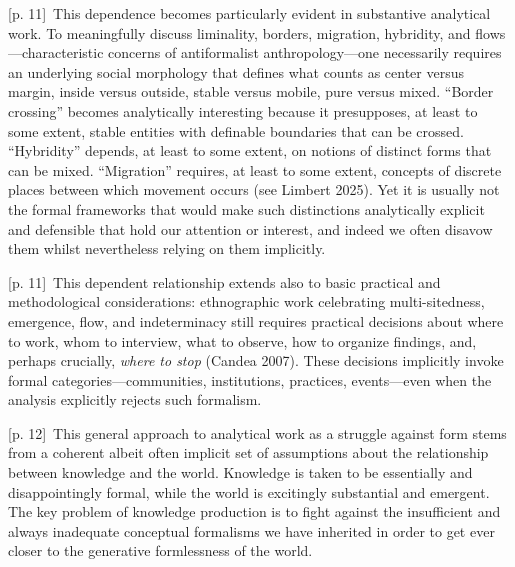 \documentclass[10pt,a4paper]{article}
\begin{document}
{\scriptsize\color{gray} [p. 11]}\ This dependence becomes particularly evident in substantive analytical work. To meaningfully discuss liminality, borders, migration, hybridity, and flows—characteristic concerns of antiformalist anthropology—one necessarily requires an underlying social morphology that defines what counts as center versus margin, inside versus outside, stable versus mobile, pure versus mixed. “Border crossing” becomes analytically interesting because it presupposes, at least to some extent, stable entities with definable boundaries that can be crossed. “Hybridity” depends, at least to some extent, on notions of distinct forms that can be mixed. “Migration” requires, at least to some extent, concepts of discrete places between which movement occurs (see Limbert 2025). Yet it is usually not the formal frameworks that would make such distinctions analytically explicit and defensible that hold our attention or interest, and indeed we often disavow them whilst nevertheless relying on them implicitly.\par
{\scriptsize\color{gray} [p. 11]}\ This dependent relationship extends also to basic practical and methodological considerations: ethnographic work celebrating multi-sitedness, emergence, flow, and indeterminacy still requires practical decisions about where to work, whom to interview, what to observe, how to organize findings, and, perhaps crucially, \textit{where to stop} (Candea 2007). These decisions implicitly invoke formal categories—communities, institutions, practices, events—even when the analysis explicitly rejects such formalism.\par
{\scriptsize\color{gray} [p. 12]}\ This general approach to analytical work as a struggle against form stems from a coherent albeit often implicit set of assumptions about the relationship between knowledge and the world. Knowledge is taken to be essentially and disappointingly formal, while the world is excitingly substantial and emergent. The key problem of knowledge production is to fight against the insufficient and always inadequate conceptual formalisms we have inherited in order to get ever closer to the generative formlessness of the world.\par
\end{document}
